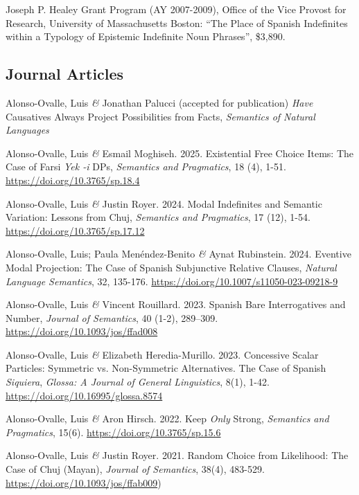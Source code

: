 \documentclass[11pt]{article}
\begin{document}
Joseph P. Healey Grant Program (AY 2007-2009), Office of the Vice Provost for Research, University of Massachusetts Boston: ``The Place of Spanish Indefinites within a Typology of Epistemic Indefinite Noun Phrases'', \$3,890.


\subsection*{Journal Articles}

Alonso-Ovalle, Luis \textit{\&} Jonathan Palucci (accepted for publication) \textit{Have} Causatives Always Project Possibilities from Facts, \textit{Semantics of Natural Languages}

Alonso-Ovalle, Luis \textit{\&} Esmail Moghiseh. 2025. Existential Free Choice Items: The Case of Farsi \textit{Yek -i} DPs, \textit{Semantics and Pragmatics}, 18 (4), 1-51. \href{https://doi.org/10.3765/sp.18.4}{https://doi.org/10.3765/sp.18.4}


Alonso-Ovalle, Luis \textit{\&} Justin Royer. 2024. Modal Indefinites and Semantic Variation: Lessons from Chuj, \textit{Semantics and Pragmatics}, 17 (12), 1-54. \href{https://doi.org/10.3765/sp.17.12}{https://doi.org/10.3765/sp.17.12}


Alonso-Ovalle, Luis; Paula Men\'endez-Benito \textit{\&} Aynat Rubinstein. 2024. Eventive Modal Projection: The Case of Spanish Subjunctive Relative Clauses, \textit{Natural Language Semantics}, 32, 135-176. \href{https://doi.org/10.1007/s11050-023-09218-9}{https://doi.org/10.1007/s11050-023-09218-9}


Alonso-Ovalle, Luis \textit{\&} Vincent Rouillard. 2023. Spanish Bare Interrogatives and Number, \textit{Journal of Semantics}, 40 (1-2), 289--309. \href{https://doi.org/10.1093/jos/ffad008}{https://doi.org/10.1093/jos/ffad008}


Alonso-Ovalle, Luis \textit{\&} Elizabeth Heredia-Murillo. 2023. Concessive Scalar Particles:
Symmetric vs. Non-Symmetric Alternatives.
The Case of Spanish \textit{Siquiera}, \textit{Glossa: A Journal of General Linguistics}, 8(1), 1-42. \href{https://doi.org/10.16995/glossa.8574}{https://doi.org/10.16995/glossa.8574}

 
Alonso-Ovalle, Luis \textit{\&} Aron Hirsch. 2022. Keep \textit{Only} Strong,  \textit{Semantics and Pragmatics}, 15(6). \href{https://doi.org/10.3765/sp.15.6}{https://doi.org/10.3765/sp.15.6}

Alonso-Ovalle, Luis \textit{\&} Justin Royer. 2021. Random Choice from Likelihood: The Case of Chuj (Mayan), \textit{Journal of Semantics}, 38(4), 483-529. \href{https://doi.org/10.1093/jos/ffab009}{https://doi.org/10.1093/jos/ffab009})
\end{document}
